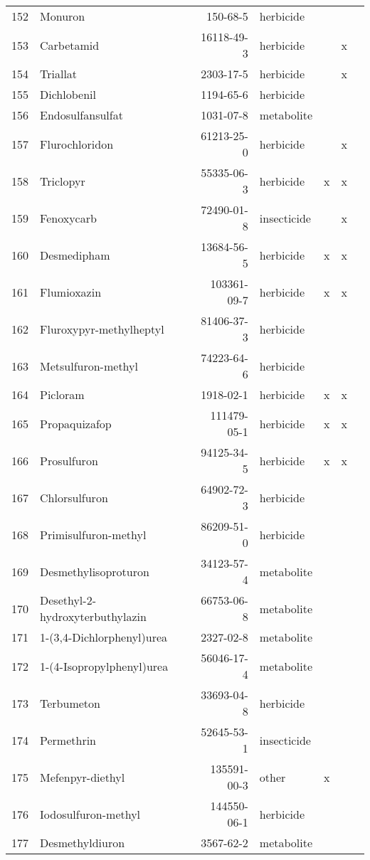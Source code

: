 \begin{longtable}{lp{3cm}rlp{0.5cm}p{0.5cm}p{1.5cm}}
  152 & Monuron & 150-68-5 & herbicide &  &  &  \\ 
  153 & Carbetamid & 16118-49-3 & herbicide &  & x &  \\ 
  154 & Triallat & 2303-17-5 & herbicide &  & x &  \\ 
  155 & Dichlobenil & 1194-65-6 & herbicide &  &  &  \\ 
  156 & Endosulfansulfat & 1031-07-8 & metabolite &  &  &  \\ 
  157 & Flurochloridon & 61213-25-0 & herbicide &  & x &  \\ 
  158 & Triclopyr & 55335-06-3 & herbicide & x & x &  \\ 
  159 & Fenoxycarb & 72490-01-8 & insecticide &  & x &  \\ 
  160 & Desmedipham & 13684-56-5 & herbicide & x & x &  \\ 
  161 & Flumioxazin & 103361-09-7 & herbicide & x & x &  \\ 
  162 & Fluroxypyr-methylheptyl & 81406-37-3 & herbicide &  &  &  \\ 
  163 & Metsulfuron-methyl & 74223-64-6 & herbicide &  &  &  \\ 
  164 & Picloram & 1918-02-1 & herbicide & x & x &  \\ 
  165 & Propaquizafop & 111479-05-1 & herbicide & x & x &  \\ 
  166 & Prosulfuron & 94125-34-5 & herbicide & x & x &  \\ 
  167 & Chlorsulfuron & 64902-72-3 & herbicide &  &  &  \\ 
  168 & Primisulfuron-methyl & 86209-51-0 & herbicide &  &  &  \\ 
  169 & Desmethylisoproturon & 34123-57-4 & metabolite &  &  &  \\ 
  170 & Desethyl-2-hydroxyterbuthylazin & 66753-06-8 & metabolite &  &  &  \\ 
  171 & 1-(3,4-Dichlorphenyl)urea & 2327-02-8 & metabolite &  &  &  \\ 
  172 & 1-(4-Isopropylphenyl)urea & 56046-17-4 & metabolite &  &  &  \\ 
  173 & Terbumeton & 33693-04-8 & herbicide &  &  &  \\ 
  174 & Permethrin & 52645-53-1 & insecticide &  &  &  \\ 
  175 & Mefenpyr-diethyl & 135591-00-3 & other & x &  &  \\ 
  176 & Iodosulfuron-methyl & 144550-06-1 & herbicide &  &  &  \\ 
  177 & Desmethyldiuron & 3567-62-2 & metabolite &  &  &  \\ 

\end{longtable}
